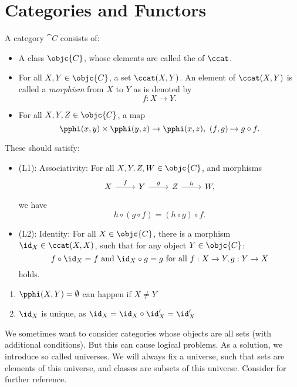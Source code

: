 \chapter{Categories and Functors}
\begin{defn}
  A category $\cat{C}$ consists of:
  \begin{itemize}
    \item A class $\objc{C}$, whose elements are called the  of $\ccat$.
    \item For all $X,Y\in \objc{C}$, a set $\ccat(X,Y)$. An element of $\ccat(X,Y)$ is called a \emph{morphism}  from $X$ to $Y$ as is denoted by
    \[
    f:X\to Y.
    \]
    \item For all $X,Y,Z\in \objc{C}$, a map
    \[
    \pphi(x,y)\times \pphi(y,z)\to \pphi(x,z),~(f,g)\mapsto g\circ f.
    \]
  \end{itemize}
  These should satisfy:
  \begin{itemize}
    \item (L1): Associativity: For all $X,Y,Z,W\in \objc{C}$, and morphisms
    \[
    \begin{tikzcd}
      X\ar{r}{f}&Y\ar{r}{g}&Z\ar{r}{h}&W,
    \end{tikzcd}
    \]
    we have
    \[
    h\circ(g\circ f)=(h\circ g)\circ f .
    \]
    \item (L2): Identity: For all $X\in \objc{C}$, there is a morphism $\id_X\in \ccat(X,X)$, such that for any object $Y\in \objc{C}$:
    \[
    f\circ \id_X=f\text{ and }\id_X\circ g=g\text{ for all }f:X\to Y,g:Y\to X
    \]
    holds.
  \end{itemize}
  \end{defn}

  \begin{rem}
    \begin{enumerate}
      \item $\pphi(X,Y)=\emptyset$ can happen if $X\neq Y$
      \item $\id_X$ is unique, as $\id_X=\id_X\circ \id_{X}'=\id_X'$
    \end{enumerate}
  \end{rem}
  \begin{rem}
    We sometimes want to consider categories whose objects are all sets (with additional conditions). But this can cause logical problems. As a solution, we introduce so called universes. We will always fix a universe, such that sets are elements of this universe, and classes are subsets of this universe. Consider \cite[1.6]{catwork} for further reference.
  \end{rem}
  
